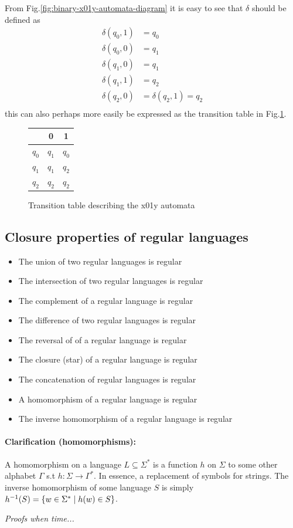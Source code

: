 From Fig.\ref{fig:binary-x01y-automata-diagram} it is easy to see that $\delta$ should be defined as 
\begin{align*}
    \delta(q_0, 1) &= q_0 \\
    \delta(q_0, 0) &= q_1 \\
    \delta(q_1, 0) &= q_1 \\
    \delta(q_1, 1) &= q_2 \\
    \delta(q_2, 0) &= \delta(q_2, 1) = q_2 \\
\end{align*}
this can also perhaps more easily be expressed as the transition table in Fig.\ref{fig:binary-x01y-automata-table}.
\begin{figure}[h]
    \centering
    \begin{tabular}{c||c|c}
              & 0     & 1 \\\hline
        $q_0$ & $q_1$ & $q_0$ \\\hline
        $q_1$ & $q_1$ & $q_2$\\\hline
        $q_2$ & $q_2$ & $q_2$ \\
    \end{tabular}
    \caption{Transition table describing the x01y automata}
    \label{fig:binary-x01y-automata-table}
\end{figure}

\subsection{Closure properties of regular languages}

\begin{itemize}
    \item The union of two regular languages is regular
    \item The intersection of two regular languages is regular
    \item The complement of a regular language is regular
    \item The difference of two regular languages is regular
    \item The reversal of of a regular language is regular
    \item The closure (star) of a regular language is regular
    \item The concatenation of regular languages is regular
    \item A homomorphism of a regular language is regular
    \item The inverse homomorphism of a regular language is regular
\end{itemize}

\paragraph{Clarification (homomorphisms):} A homomorphism on a language $L \subseteq \Sigma^*$ is a function $h$ on $\Sigma$ to some other alphabet $\Gamma$ s.t $h: \Sigma \rightarrow \Gamma^*$. In essence, a replacement of symbols for strings. The inverse homomorphism of some language $S$ is simply $h^{-1}(S) = \left\{ w \in \Sigma^* \mid h(w) \in S \right\}$.

\textit{Proofs when time...}

